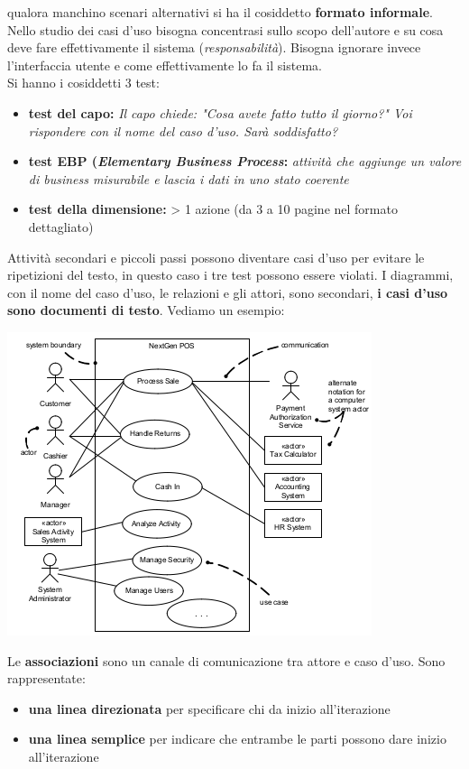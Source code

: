 \documentclass[a4paper,12pt, oneside]{book}
\begin{document}
qualora manchino scenari alternativi si ha il cosiddetto \textbf{formato informale}.\\
Nello studio dei casi d'uso bisogna concentrasi sullo scopo dell'autore e su cosa deve fare effettivamente il sistema (\textit{responsabilità}). Bisogna ignorare invece l'interfaccia utente e come effettivamente lo fa il sistema. \\
Si hanno i cosiddetti 3 test:
\begin{itemize}
\item \textbf{test del capo:} \textit{Il capo chiede: "Cosa avete fatto tutto il giorno?"
Voi rispondere con il nome del caso d'uso. Sarà
soddisfatto?}
\item \textbf{test EBP (\textit{Elementary Business Process}:} \textit{attività che aggiunge un valore di business misurabile e lascia i dati in uno stato coerente}
\item \textbf{test della dimensione:} > 1 azione
(da 3 a 10 pagine nel formato dettagliato)
\end{itemize}
Attività secondari e piccoli passi possono
diventare casi d'uso per evitare le ripetizioni del
testo, in questo caso i tre test possono essere
violati. I diagrammi, con il nome del caso d'uso, le relazioni e gli attori, sono secondari, \textbf{i casi d'uso sono documenti di testo}. Vediamo un esempio:
\begin{center}
\includegraphics[scale=0.8]{img/cas.png}
\end{center}
Le \textbf{associazioni} sono un canale di comunicazione tra attore e caso d'uso. Sono rappresentate:
\begin{itemize}
\item \textbf{una linea direzionata} per specificare chi da inizio all'iterazione
\item \textbf{una linea semplice} per indicare che entrambe le parti possono dare inizio all'iterazione
\end{itemize} 
\end{document}
